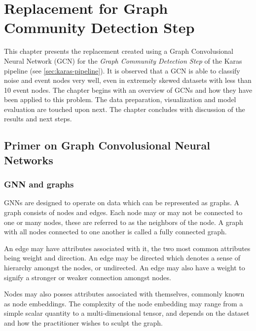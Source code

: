 
\chapter{Replacement for Graph Community Detection Step} %
\label{cha:gcd}
% 

This chapter presents the replacement created using a Graph
Convolusional Neural Network (GCN) for the \emph{Graph Community Detection
Step} of the Karas pipeline (see \ref{sec:karas-pipeline}). It is
observed that a GCN is able to classify noise and event nodes very
well, even in extremely skewed datasets with less than 10 event nodes.
The chapter begins with an overview of GCNs and how they have been
applied to this problem. The data preparation, visualization and model
evaluation are touched upon next. The chapter concludes with
discussion of the results and next steps.

\section{Primer on Graph Convolusional Neural Networks}
\label{sec:gcn-primer}

\subsection{GNN and graphs}

GNNs are designed to operate on data which can be represented as
graphs. A graph consists of nodes and edges. Each node may or may not
be connected to one or many nodes, these are referred to as the
neighbors of the node. A graph with all nodes connected to one another
is called a fully connected graph.

An edge may have attributes associated with it, the two most common
attributes being weight and direction. An edge may be directed which
denotes a sense of hierarchy amongst the nodes, or undirected. An edge
may also have a weight to signify a stronger or weaker connection
amongst nodes.

Nodes may also posses attributes associated with themselves, commonly
known as node embeddings. The complexity of the node embedding may
range from a simple scalar quantity to a multi-dimensional tensor,
and depends on the dataset and how the practitioner wishes to sculpt
the graph.

